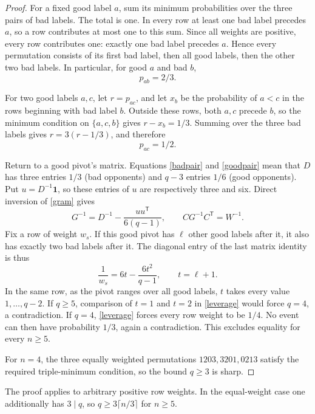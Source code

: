 \documentclass[11pt]{article}
\begin{document}
\begin{proof}
For a fixed good label $a$, sum its minimum probabilities over the
three pairs of bad labels. The total is one. In every row at least
one bad label precedes $a$, so a row contributes at most one to this
sum. Since all weights are positive, every row contributes one:
exactly one bad label precedes $a$. Hence every permutation consists
of its first bad label, then all good labels, then the other two bad
labels. In particular, for good $a$ and bad $b$,
\begin{equation}\label{badpair}
 p_{ab}=2/3.
\end{equation}

For two good labels $a,c$, let $r=p_{ac}$, and let $x_b$ be the
probability of $a<c$ in the rows beginning with bad label $b$.
Outside these rows, both $a,c$ precede $b$, so the minimum condition
on $\{a,c,b\}$ gives $r-x_b=1/3$. Summing over the three bad labels
gives $r=3(r-1/3)$, and therefore
\begin{equation}\label{goodpair}
 p_{ac}=1/2.
\end{equation}

Return to a good pivot's matrix. Equations \eqref{badpair} and
\eqref{goodpair} mean that $D$ has three entries $1/3$ (bad
opponents) and $q-3$ entries $1/6$ (good opponents). Put
$u=D^{-1}\mathbf1$, so these entries of $u$ are respectively three
and six. Direct inversion of \eqref{gram} gives
\[
 G^{-1}=D^{-1}-\frac{uu^{\mathsf T}}{6(q-1)},\qquad
 CG^{-1}C^{\mathsf T}=W^{-1}.
\]
Fix a row of weight $w_s$. If this good pivot has $\ell$ other good
labels after it, it also has exactly two bad labels after it.
The diagonal entry of the last matrix identity is thus
\begin{equation}\label{leverage}
 \frac1{w_s}=6t-\frac{6t^2}{q-1},\qquad t=\ell+1.
\end{equation}
In the same row, as the pivot ranges over all good labels, $t$ takes
every value $1,\ldots,q-2$. If $q\ge5$, comparison of $t=1$ and
$t=2$ in \eqref{leverage} would force $q=4$, a contradiction.
If $q=4$, \eqref{leverage} forces every row weight to be $1/4$.
No event can then have probability $1/3$, again a contradiction.
This excludes equality for every $n\ge5$.

For $n=4$, the three equally weighted permutations
$1203,3201,0213$ satisfy the required triple-minimum condition,
so the bound $q\ge3$ is sharp.
\end{proof}

The proof applies to arbitrary positive row weights. In the
equal-weight case one additionally has $3\mid q$, so
$q\ge3\lceil n/3\rceil$ for $n\ge5$.
\end{document}
